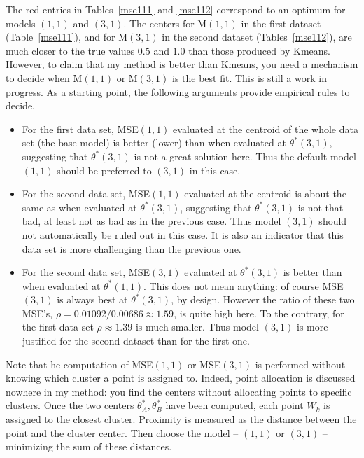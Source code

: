 \documentclass[oneside,10pt]{book}
\begin{document}
The red entries in Tables~\ref{mse111} and \ref{mse112} correspond to an optimum for models $(1,1)$ and $(3,1)$. The centers for M$(1,1)$ in the first dataset (Table~\ref{mse111}), and for M$(3,1)$ in the second dataset (Tables~\ref{mse112}), are much closer to the true values
$0.5$ and $1.0$ than those produced by Kmeans. However, to claim that my method is better than Kmeans, you need a mechanism to decide
 when M$(1,1)$ or M$(3,1)$ is the best fit.  This is still a work in progress.
As a starting point, the following arguments provide empirical rules to decide.
\begin{itemize}
\item For the first data set, MSE$(1,1)$ evaluated at the centroid of the whole data set (the base model)
 is better (lower) than when evaluated at $\theta^*(3,1)$, suggesting that $\theta^*(3,1)$ is not a great solution here. Thus the default model $(1,1)$
 should be
preferred to $(3,1)$ in this case.
\item For the second data set, MSE$(1,1)$ evaluated at the centroid
 is about the same as when evaluated at $\theta^*(3,1)$, suggesting that $\theta^*(3,1)$ is not that bad, at least not as bad as in the previous case. Thus model $(3,1)$ should not automatically be ruled out in this case. It is also an indicator that this data set is more challenging than the previous one.
\item For the second data set, MSE$(3,1)$ evaluated at  $\theta^*(3,1)$ is better than when evaluated at $\theta^*(1,1)$. This does not mean
anything: of course MSE$(3,1)$ is always best at $\theta^*(3,1)$, by design.
However the ratio of these two MSE's,  $\rho = 0.01092 / 0.00686 \approx 1.59$, is quite high here. To the contrary, for the first data set
$\rho \approx 1.39$ is much smaller. Thus model $(3,1)$ is more justified for the second dataset than for the
 first one.
\end{itemize}

\noindent Note that he computation of MSE$(1,1)$ or MSE$(3,1)$ is performed without knowing which cluster a point is assigned to. Indeed, point allocation is discussed nowhere in my method: you find the centers without allocating points to specific clusters. Once the two centers
$\theta_A^*,\theta_B^*$ have been computed, each point $W_k$ is assigned to the closest cluster. Proximity is measured as the distance between the point and the cluster center.
Then choose the model -- $(1,1)$ or $(3, 1)$ -- minimizing the sum of these distances.
\end{document}
